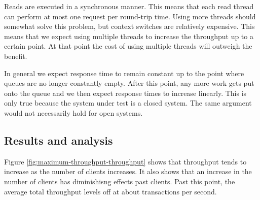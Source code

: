 \documentclass[11pt]{article}
\begin{document}
Reads are executed in a synchronous manner.
This means that each read thread can perform at most one request per round-trip time.
Using more threads should somewhat solve this problem, but context switches are relatively expensive.
This means that we expect using multiple threads to increase the throughput up to a certain point.
At that point the cost of using multiple threads will outweigh the benefit.

In general we expect response time to remain constant up to the point where queues are no longer constantly empty.
After this point, any more work gets put onto the queue and we then expect response times to increase linearly.
This is only true because the system under test is a closed system.
The same argument would not necessarily hold for open systems.

\subsection{Results and analysis}

Figure \ref{fig:maximum-throughput-throughput} shows that throughput tends to increase as the number of clients increases.
It also shows that an increase in the number of clients has diminishisng effects past \FIWRD clients.
Past this point, the average total throughput levels off at about \FIWRD transactions per second.

\end{document}
